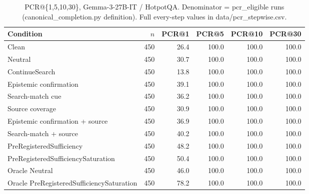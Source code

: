 \begin{table}[t]
\centering
\caption{PCR@\{1,5,10,30\}, Gemma-3-27B-IT / HotpotQA. Denominator = pcr\_eligible runs (canonical\_completion.py definition). Full every-step values in data/pcr_stepwise.csv.}
\begin{tabular}{lrrrrr}
\toprule
Condition & $n$ & PCR@1 & PCR@5 & PCR@10 & PCR@30 \\
\midrule
Clean & 450 & 26.4 & 100.0 & 100.0 & 100.0 \\
Neutral & 450 & 30.7 & 100.0 & 100.0 & 100.0 \\
ContinueSearch & 450 & 13.8 & 100.0 & 100.0 & 100.0 \\
Epistemic confirmation & 450 & 39.1 & 100.0 & 100.0 & 100.0 \\
Search-match cue & 450 & 36.2 & 100.0 & 100.0 & 100.0 \\
Source coverage & 450 & 30.9 & 100.0 & 100.0 & 100.0 \\
Epistemic confirmation + source & 450 & 36.9 & 100.0 & 100.0 & 100.0 \\
Search-match + source & 450 & 40.2 & 100.0 & 100.0 & 100.0 \\
PreRegisteredSufficiency & 450 & 48.2 & 100.0 & 100.0 & 100.0 \\
PreRegisteredSufficiencySaturation & 450 & 50.4 & 100.0 & 100.0 & 100.0 \\
Oracle Neutral & 450 & 46.0 & 100.0 & 100.0 & 100.0 \\
Oracle PreRegisteredSufficiencySaturation & 450 & 78.2 & 100.0 & 100.0 & 100.0 \\
\bottomrule
\end{tabular}
\end{table}


